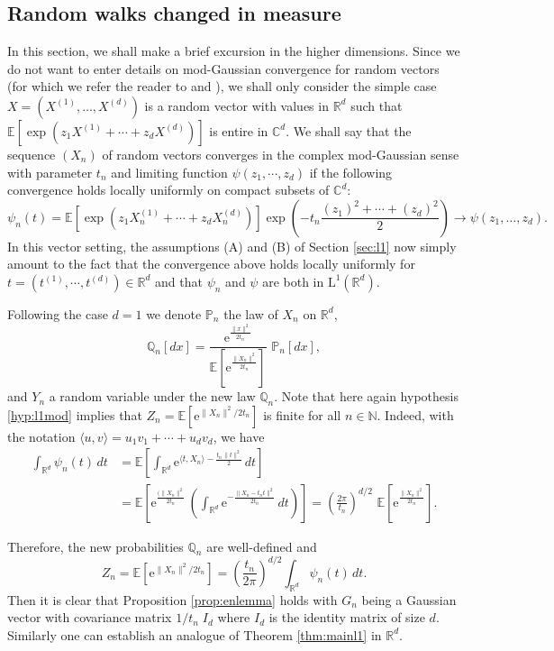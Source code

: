 \documentclass[12pt,a4paper,reqno]{amsart}
\newcommand{\N}{\mathbb{N}}
\newcommand{\R}{\mathbb{R}}
\newcommand{\CC}{\mathbb{C}}
\newcommand{\E}{\mathrm{e}}
\newcommand{\esper}{\mathbb{E}}
\newcommand{\proba}{\mathbb{P}}
\newcommand{\qproba}{\mathbb{Q}}
\theoremstyle{remark}
\begin{document}
\subsection{Random walks changed in measure}\label{subsec:randomwalkchange}
In this section, we shall make a brief excursion in the higher dimensions. Since we do not want to enter details on mod-Gaussian convergence for random vectors (for which we refer the reader to \cite{KN12} and \cite{FMN13}), we shall only consider the simple case $X=(X^{(1)},\ldots,X^{(d)})$ is a random vector with values in $\R^d$ such that $\mathbb E[\exp(z_1 X^{(1)}+\cdots+z_d X^{(d)})]$ is entire in $\CC^d$. We shall say that the sequence $(X_n)$ of random vectors converges in the complex  mod-Gaussian sense with parameter $t_n$ and limiting function $\psi(z_1,\cdots,z_d)$ if the following convergence holds locally uniformly on compact subsets of $\CC^d$:
$$\psi_n(t)= \mathbb E[\exp(z_1 X_n^{(1)}+\cdots+z_d X_n^{(d)})]\exp\left(-t_n \frac{(z_1)^2+\cdots+(z_d)^2}{2}\right)\to \psi(z_1,\ldots,z_d).$$
In this vector setting, the assumptions (A) and (B) of Section \ref{sec:l1} now simply amount to the fact that the convergence above holds locally uniformly for $t=(t^{(1)},\cdots,t^{(d)})\in\R^d$ and that $\psi_n$ and $\psi$ are both in $\mathrm{L}^1(\R^d)$.\bigskip

Following the case $d=1$ we denote $\proba_n$ the law of $X_n$ on $\R^d$, 
$$
\qproba_n[dx]=\frac{\E^{\frac{\|x\|^2}{2t_n}}}{\esper\!\left[\E^{\frac{\|X_n\|^2}{2t_n}}\right]}\,\,\proba_n[dx],
$$
and $Y_n$ a random variable under the new law $\qproba_n$. Note that here again hypothesis \eqref{hyp:l1mod} implies that $Z_n=\esper[\E^{\|X_n\|^2/2t_n}]$ is finite for all $n \in \N$. Indeed, with the notation $\langle u,v\rangle=u_1v_1+\cdots+u_dv_d$, we have
\begin{align*}
\int_{\R^d} \psi_n(t)\,dt &= \esper\!\left[\int_{\R^d} \E^{\langle t, X_n\rangle-\frac{t_n \,\|t\|^2}{2}}\,dt\right] \\
&=\esper\!\left[\E^{\frac{(\|X_n\|^2}{2t_n}}\,\left(\int_{\R^d} \E^{-\frac{\|X_n-t_n t\|^2}{2t_n}}\,dt\right)\right]=\left(\frac{2\pi}{t_n}\right)^{d/2}\,\,\esper\!\left[\E^{\frac{\|X_n\|^2}{2t_n}}\right].
\end{align*}


Therefore, the new probabilities $\qproba_n$ are well-defined and $$Z_n=\esper[\E^{\|X_n\|^2/2t_n}]=\left(\frac{t_n}{2\pi}\right)^{d/2}\int_{\R^d} \psi_n(t)\,dt.$$
Then it is clear that Proposition \ref{prop:enlemma} holds with $G_n$ being a Gaussian vector with covariance matrix $1/t_n\; I_d$ where $I_d$ is the identity matrix of size $d$. Similarly one can establish an analogue of Theorem \ref{thm:mainl1} in $\R^d$.
\bigskip
\end{document}
